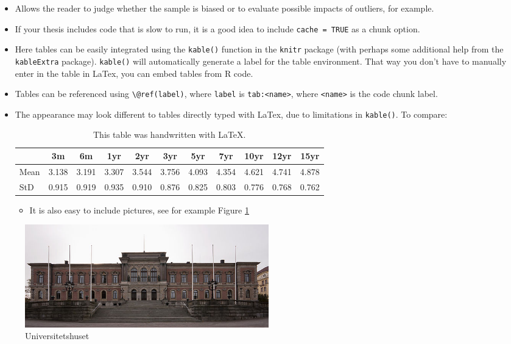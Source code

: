 \documentclass[a4paper,11pt]{article}
\providecommand{\tightlist}{%
  \setlength{\itemsep}{0pt}\setlength{\parskip}{0pt}}
\begin{document}
\begin{itemize}
\item
  Allows the reader to judge whether the sample is biased or to evaluate
  possible impacts of outliers, for example.
\item
  If your thesis includes code that is slow to run, it is a good idea to include
  \texttt{cache\ =\ TRUE} as a chunk option.
\item
  Here tables can be easily integrated using the \texttt{kable()} function in the
  \texttt{knitr} package (with perhaps some additional help from the \texttt{kableExtra}
  package). \texttt{kable()} will automatically generate a label for the table
  environment. That way you don't have to manually enter in the table in LaTex,
  you can embed tables from R code.
\item
  Tables can be referenced using \texttt{\textbackslash{}@ref(label)}, where \texttt{label} is \texttt{tab:\textless{}name\textgreater{}},
  where \texttt{\textless{}name\textgreater{}} is the code chunk label.
\item
  The appearance may look different to tables directly typed with LaTex, due to
  limitations in \texttt{kable()}. To compare:
  \begin{table}[ht]
    \begin{center}
        {\footnotesize
        \begin{tabular}{l|cccccccccc}
            \hline \hline
                      & 3m    & 6m    & 1yr   & 2yr   & 3yr   & 5yr   & 7yr   & 10yr  & 12yr  & 15yr   \\
            \hline
                Mean   & 3.138 & 3.191 & 3.307 & 3.544 & 3.756 & 4.093 & 4.354 & 4.621 & 4.741 & 4.878  \\
                StD    & 0.915 & 0.919 & 0.935 & 0.910 & 0.876 & 0.825 & 0.803 & 0.776 & 0.768 & 0.762  \\
            \hline \hline
        \end{tabular}}
    \end{center}
    \caption{This table was handwritten with LaTeX.}
    \label{tab:table2}
    \end{table}
  \begin{itemize}
  \tightlist
  \item
    It is also easy to include pictures, see for example Figure \ref{fig:figureUniversitetshuset}
  \end{itemize}
\end{itemize}
\begin{figure}

{\centering \includegraphics[width=400px]{images/universitetshuset} 

}

\caption{Universitetshuset}\label{fig:figureUniversitetshuset}
\end{figure}
\end{document}
